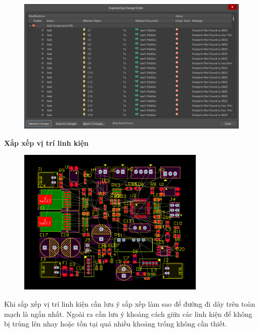 \begin{figure}[H]
    \centering
    \includegraphics[width=1\textwidth]{pictures/7c.png}
\end{figure}
\cleardoublepage
\textbf{Xắp xếp vị trí linh kiện}
\begin{figure}[H]
    \centering
    \includegraphics[width=0.8\textwidth]{pictures/7d.png}
\end{figure}
Khi sắp xếp vị trí linh kiện cần lưu ý sắp xếp làm sao để đường đi dây trên toàn mạch là ngắn nhất. Ngoài ra cần lưu ý khoảng cách giữa các linh kiện để không bị trùng lên nhay hoặc tồn tại quá nhiều khoảng trống không cần thiết.